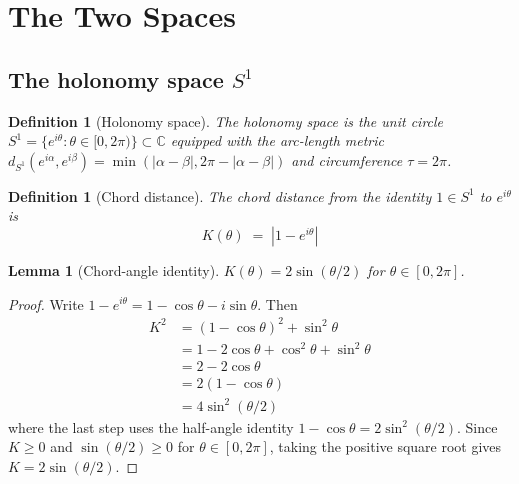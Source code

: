 \documentclass[11pt,letterpaper]{article}
\newtheorem{lemma}[theorem]{Lemma}
\newtheorem{definition}[theorem]{Definition}
\begin{document}

\section{The Two Spaces}

\subsection{The holonomy space $S^1$}

\begin{definition}[Holonomy space]\label{def:S1}
The holonomy space is the unit circle $S^1 = \{e^{i\theta} : \theta \in [0, 2\pi)\} \subset \mathbb{C}$ equipped with the arc-length metric $d_{S^1}(e^{i\alpha}, e^{i\beta}) = \min(|\alpha - \beta|, 2\pi - |\alpha - \beta|)$ and circumference $\tau = 2\pi$.
\end{definition}

\begin{definition}[Chord distance]\label{def:chord}
The chord distance from the identity $1 \in S^1$ to $e^{i\theta}$ is
\begin{equation}
K(\theta) \;=\; |1 - e^{i\theta}|
\end{equation}
\end{definition}

\begin{lemma}[Chord-angle identity]\label{lem:chord}
$K(\theta) = 2\sin(\theta/2)$ for $\theta \in [0, 2\pi]$.
\end{lemma}

\begin{proof}
Write $1 - e^{i\theta} = 1 - \cos\theta - i\sin\theta$. Then
\begin{align}
K^2 &= (1 - \cos\theta)^2 + \sin^2\theta \\
&= 1 - 2\cos\theta + \cos^2\theta + \sin^2\theta \\
&= 2 - 2\cos\theta \\
&= 2(1 - \cos\theta) \\
&= 4\sin^2(\theta/2)
\end{align}
where the last step uses the half-angle identity $1 - \cos\theta = 2\sin^2(\theta/2)$. Since $K \geq 0$ and $\sin(\theta/2) \geq 0$ for $\theta \in [0, 2\pi]$, taking the positive square root gives $K = 2\sin(\theta/2)$.
\end{proof}
\end{document}

